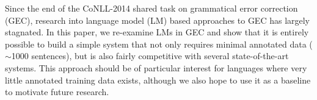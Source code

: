 Since the end of the CoNLL-2014 shared task on grammatical error correction (GEC), research into language model (LM) based approaches to GEC has largely stagnated. In this paper, we re-examine LMs in GEC and show that it is entirely possible to build a simple system that not only requires minimal annotated data ($\sim$1000 sentences), but is also fairly competitive with several state-of-the-art systems. This approach should be of particular interest for languages where very little annotated training data exists, although we also hope to use it as a baseline to motivate future research.
